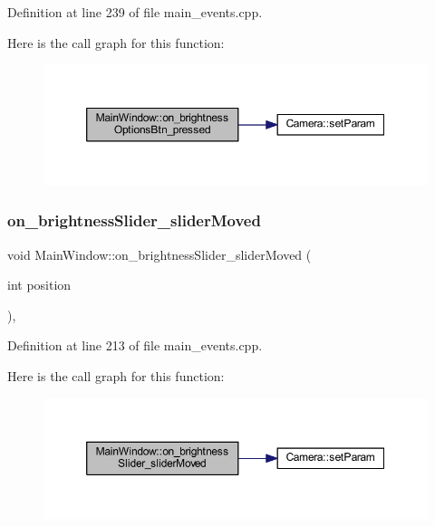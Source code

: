 Definition at line 239 of file main\+\_\+events.\+cpp.

Here is the call graph for this function\+:
\nopagebreak
\begin{figure}[H]
\begin{center}
\leavevmode
\includegraphics[width=350pt]{class_main_window_a8b3a042f694a5013ad5e65253bc3a0ae_cgraph}
\end{center}
\end{figure}
\mbox{\label{class_main_window_aaaa1dd957c7f0cc75f5dec42ef429c81}} 
\subsubsection{\texorpdfstring{on\_brightnessSlider\_sliderMoved}{on\_brightnessSlider\_sliderMoved}}
{\footnotesize\ttfamily void Main\+Window\+::on\+\_\+brightness\+Slider\+\_\+slider\+Moved (\begin{DoxyParamCaption}\item[{int}]{position }\end{DoxyParamCaption})\hspace{0.3cm}{\ttfamily [private]}, {\ttfamily [slot]}}



Definition at line 213 of file main\+\_\+events.\+cpp.

Here is the call graph for this function\+:
\nopagebreak
\begin{figure}[H]
\begin{center}
\leavevmode
\includegraphics[width=350pt]{class_main_window_aaaa1dd957c7f0cc75f5dec42ef429c81_cgraph}
\end{center}
\end{figure}
\mbox{\label{class_main_window_a2a1fcefe2bf1f110eb2c589ac57b07d7}} 
